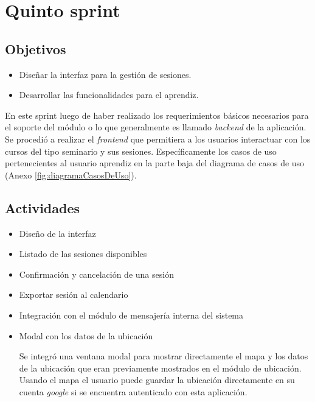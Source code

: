 \section{Quinto sprint} %
\label{sec:quinto_sprint}

\subsection{Objetivos}

\begin{itemize}
	\item Diseñar la interfaz para la gestión de sesiones.
	\item Desarrollar las funcionalidades para el aprendiz.
\end{itemize}

En este sprint luego de haber realizado los requerimientos básicos necesarios para el soporte del módulo o lo que generalmente es llamado \emph{backend} de la aplicación. Se procedió a realizar el \emph{frontend} que permitiera a los usuarios interactuar con los cursos del tipo seminario y sus sesiones. Específicamente los casos de uso pertenecientes al usuario aprendiz en la parte baja del diagrama de casos de uso (Anexo \ref{fig:diagramaCasosDeUso}).

\subsection{Actividades} %
\label{sub:actividades5}

\begin{itemize}

\item Diseño de la interfaz
\item Listado de las sesiones disponibles
\item Confirmación y cancelación de una sesión
\item Exportar sesión al calendario
\item Integración con el módulo de mensajería interna del sistema
\item Modal con los datos de la ubicación

	Se integró una ventana modal para mostrar directamente el mapa y los datos de la ubicación que eran previamente mostrados en el módulo de ubicación. Usando el mapa el usuario puede guardar la ubicación directamente en su cuenta \emph{google} si se encuentra autenticado con esta aplicación.

\end{itemize}


